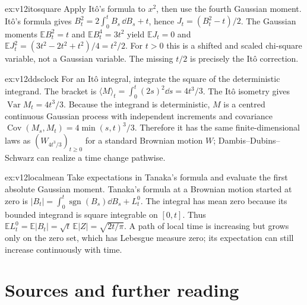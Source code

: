 \begin{solution}{ex:v12itosquare}
\idea Apply Itô's formula to $x^2$, then use the fourth Gaussian moment.
\writeup Itô's formula gives $B_t^2=2\int_0^tB_s\,\dd B_s+t$, hence $J_t=(B_t^2-t)/2$. The Gaussian moments $\mathbb EB_t^2=t$ and $\mathbb EB_t^4=3t^2$ yield $\mathbb EJ_t=0$ and $\mathbb EJ_t^2=(3t^2-2t^2+t^2)/4=t^2/2$. For $t>0$ this is a shifted and scaled chi-square variable, not a Gaussian variable. The missing $t/2$ is precisely the Itô correction.
\end{solution}

\begin{solution}{ex:v12ddsclock}
\idea For an Itô integral, integrate the square of the deterministic integrand.
\writeup The bracket is $\langle M\rangle_t=\int_0^t(2s)^2\dd s=4t^3/3$. The Itô isometry gives $\operatorname{Var}M_t=4t^3/3$. Because the integrand is deterministic, $M$ is a centred continuous Gaussian process with independent increments and covariance $\operatorname{Cov}(M_s,M_t)=4\min(s,t)^3/3$. Therefore it has the same finite-dimensional laws as $(W_{4t^3/3})_{t\ge0}$ for a standard Brownian motion $W$; Dambis--Dubins--Schwarz can realize a time change pathwise.
\end{solution}

\begin{solution}{ex:v12localmean}
\idea Take expectations in Tanaka's formula and evaluate the first absolute Gaussian moment.
\writeup Tanaka's formula at a Brownian motion started at zero is $|B_t|=\int_0^t\operatorname{sgn}(B_s)\dd B_s+L_t^0$. The integral has mean zero because its bounded integrand is square integrable on $[0,t]$. Thus $\mathbb EL_t^0=\mathbb E|B_t|=\sqrt t\,\mathbb E|Z|=\sqrt{2t/\pi}$. A path of local time is increasing but grows only on the zero set, which has Lebesgue measure zero; its expectation can still increase continuously with time.
\end{solution}

\section*{Sources and further reading}

